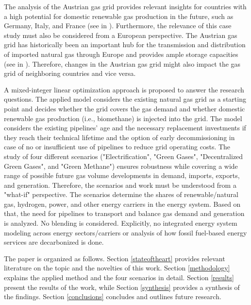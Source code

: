 The analysis of the Austrian gas grid provides relevant insights for countries with a high potential for domestic renewable gas production in the future, such as Germany, Italy, and France (see in \cite{scarlat2018biogas}). Furthermore, the relevance of this case study must also be considered from a European perspective. The Austrian gas grid has historically been an important hub for the transmission and distribution of imported natural gas through Europe and provides ample storage capacities (see in \cite{sesini2021strategic}). Therefore, changes in the Austrian gas grid might also impact the gas grid of neighboring countries and vice versa.\vspace{0.3cm}

A mixed-integer linear optimization approach is proposed to answer the research questions. The applied model considers the existing natural gas grid as a starting point and decides whether the grid covers the gas demand and whether domestic renewable gas production (i.e., biomethane) is injected into the grid. The model considers the existing pipelines' age and the necessary replacement investments if they reach their technical lifetime and the option of early decommissioning in case of no or insufficient use of pipelines to reduce grid operating costs. The study of four different scenarios ("Electrification", "Green Gases", "Decentralized Green Gases", and "Green Methane") ensures robustness while covering a wide range of possible future gas volume developments in demand, imports, exports, and generation. Therefore, the scenarios and work must be understood from a "what-if" perspective. The scenarios determine the shares of renewable/natural gas, hydrogen, power, and other energy carriers in the energy system. Based on that, the need for pipelines to transport and balance gas demand and generation is analyzed. No blending is considered. Explicitly, no integrated energy system modeling across energy sectors/carriers or analysis of how fossil fuel-based energy services are decarbonized is done.\vspace{0.3cm}

The paper is organized as follows. Section \ref{stateoftheart} provides relevant literature on the topic and the novelties of this work. Section \ref{methodology} explains the applied method and the four scenarios in detail. Section \ref{results} present the results of the work, while Section \ref{synthesis} provides a synthesis of the findings. Section \ref{conclusions} concludes and outlines future research.






